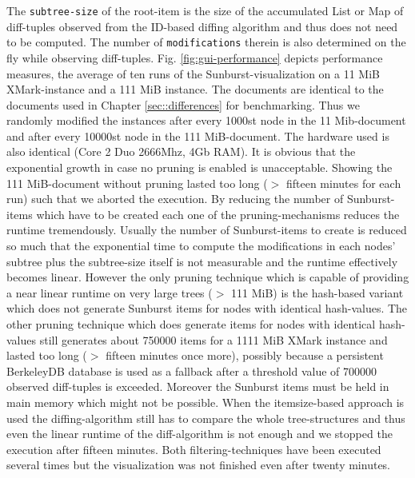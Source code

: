 The \texttt{subtree-size} of the root-item is the size of the accumulated List or Map of diff-tuples observed from the ID-based diffing algorithm and thus does not need to be computed. The number of \texttt{modifications} therein is also determined on the fly while observing diff-tuples. Fig. \ref{fig:gui-performance} depicts performance measures, the average of ten runs of the Sunburst-visualization on a 11 MiB XMark-instance and a 111 MiB instance. The documents are identical to the documents used in Chapter \ref{sec::differences} for benchmarking. Thus we randomly modified the instances after every 1000st node in the 11 Mib-document and after every 10000st node in the 111 MiB-document. The hardware used is also identical (Core 2 Duo 2666Mhz, 4Gb RAM). It is obvious that the exponential growth in case no pruning is enabled is unacceptable. Showing the 111 MiB-document without pruning lasted too long ($>$ fifteen minutes for each run) such that we aborted the execution. By reducing the number of Sunburst-items which have to be created each one of the pruning-mechanisms reduces the runtime tremendously. Usually the number of Sunburst-items to create is reduced so much that the exponential time to compute the modifications in each nodes' subtree plus the subtree-size itself is not measurable and the runtime effectively becomes linear. However the only pruning technique which is capable of providing a near linear runtime on very large trees ($>$ 111 MiB) is the hash-based variant which does not generate Sunburst items for nodes with identical hash-values. The other pruning technique which does generate items for nodes with identical hash-values still generates about 750000 items for a 1111 MiB XMark instance and lasted too long ($>$ fifteen minutes once more), possibly because a persistent BerkeleyDB database is used as a fallback after a threshold value of 700000 observed diff-tuples is exceeded. Moreover the Sunburst items must be held in main memory which might not be possible. When the itemsize-based approach is used the diffing-algorithm still has to compare the whole tree-structures and thus even the linear runtime of the diff-algorithm is not enough and we stopped the execution after fifteen minutes. Both filtering-techniques have been executed several times but the visualization was not finished even after twenty minutes. 

